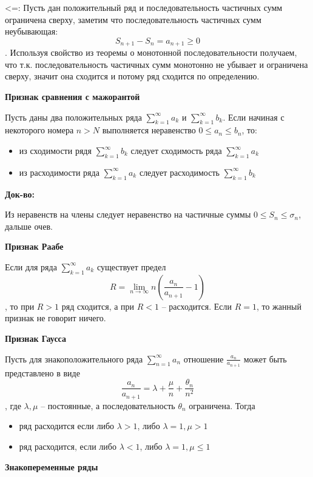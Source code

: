 \documentclass{article}
\begin{document}
	<=: Пусть дан положительный ряд и последовательность частичных сумм ограничена сверху, заметим что последовательность частичных сумм неубывающая:
	$$S_{n + 1} - S_{n} = a_{n + 1} \ge 0$$. Используя свойство из теоремы о монотонной последовательности получаем, что т.к. последовательность частичных сумм монотонно не убывает и ограничена сверху, значит она сходится и потому ряд сходится по определению.
	
	{\bf Признак сравнения с мажорантой}
	
	Пусть даны два положительных ряда $\sum\limits_{k=1}^{\infty} a_{k}$ и $\sum\limits_{k=1}^{\infty} b_{k}$. Если начиная с некоторого номера $n > N$ выполняется неравенство $0 \le a_n \le b_n$, то:
	
	\begin{itemize}
		\item из сходимости рядя $\sum\limits_{k=1}^{\infty} b_{k}$ следует сходимость ряда $\sum\limits_{k=1}^{\infty} a_{k}$
		\item из расходимости ряда $\sum\limits_{k=1}^{\infty} a_{k}$ следует расходимость $\sum\limits_{k=1}^{\infty} b_{k}$
	\end{itemize}
	
	{\bf Док-во:}
	
	Из неравенств на члены следует неравенство на частичные суммы $0 \le S_n \le \sigma_n$, дальше очев.
	
	
	{\bf Признак Раабе}
	
	Если для ряда $\sum\limits_{k=1}^{\infty} a_{k}$ существует предел $$R = \lim\limits_{n \rightarrow \infty} n (\frac{a_n}{a_{n+1}} - 1)$$, то при $R > 1$ ряд сходится, а при $R < 1$ -- расходится. Если $R = 1$, то жанный признак не говорит ничего.
	
	{\bf Признак Гаусса}
	
	Пусть для знакоположительного ряда $\sum\limits_{n=1}^{\infty} a_{n}$ отношение $\frac{a_n}{a_{n + 1}}$ может быть представлено в виде $$\frac{a_n}{a_{n + 1}} = \lambda + \frac{\mu}{n} + \frac{\theta_n}{n^2}$$, где $\lambda, \mu$ -- постоянные, а последовательность $\theta_n$ ограничена. Тогда 
	\begin{itemize}
		\item ряд расходится если либо $\lambda > 1$, либо $\lambda = 1, \mu > 1$
		\item ряд расходится, если либо $\lambda < 1$, либо $\lambda = 1, \mu \le 1$
	\end{itemize}
	
	
	{\bf Знакопеременные ряды}
	
\end{document}
